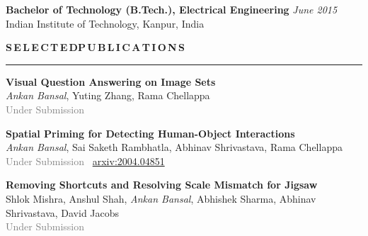 \documentclass[11pt, a4paper]{article}
\begin{document}
\vspace{3pt}

\textbf{Bachelor of Technology (B.Tech.), Electrical Engineering} \hfill  \textit{June 2015} \\
Indian Institute of Technology, Kanpur, India


\vspace{10pt}

%

\textbf{S\,E\,L\,E\,C\,T\,E\,D{\hspace{0.6em}}P\,U\,B\,L\,I\,C\,A\,T\,I\,O\,N\,S}
\vspace{5pt}
\hrule
\vspace{7pt}

\textbf{Visual Question Answering on Image Sets}\\
\textit{Ankan Bansal}, Yuting Zhang, Rama Chellappa\\
\textcolor{gray}{Under Submission}

\vspace{4pt}

\textbf{Spatial Priming for Detecting Human-Object Interactions}\\
\textit{Ankan Bansal}, Sai Saketh Rambhatla, Abhinav Shrivastava, Rama Chellappa\\
\textcolor{gray}{Under Submission} ~\href{https://arxiv.org/abs/2004.04851}{arxiv:2004.04851}

\vspace{4pt}

\textbf{Removing Shortcuts and Resolving Scale Mismatch for Jigsaw}\\
Shlok Mishra, Anshul Shah, \textit{Ankan Bansal}, Abhishek Sharma, Abhinav
Shrivastava, David Jacobs\\
\textcolor{gray}{Under Submission}
\end{document}
